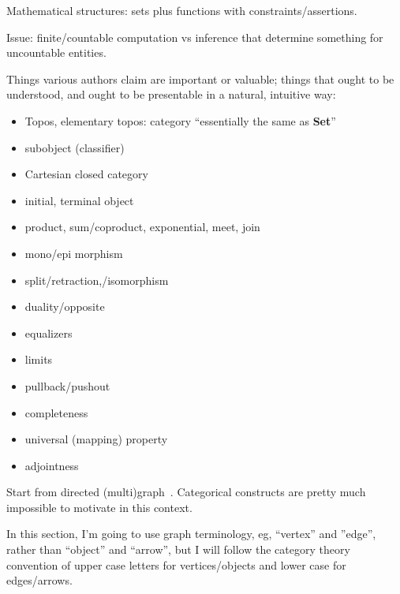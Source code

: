\documentclass[11pt,openany]{article}
\begin{document}
Mathematical structures: sets plus functions with constraints/assertions.

Issue: finite/countable computation vs inference that determine
something for uncountable entities.

\setcounter{currentlevel}{\value{baseSectionLevel}}
\label{sec:Key-ideas}

Things various authors claim are important or valuable;
things that ought to be understood,
and ought to be presentable in a natural, intuitive way:
\begin{itemize}
  \item Topos, elementary topos: 
  category ``essentially the same as \textbf{Set}''
  \item subobject (classifier)
  \item Cartesian closed category
  \item initial, terminal object
  \item product, sum/coproduct, exponential, meet, join
  \item mono/epi morphism
  \item split/retraction,/isomorphism
  \item duality/opposite
  \item equalizers
  \item limits
  \item pullback/pushout
  \item completeness
  \item universal (mapping) property
  \item adjointness
\end{itemize}
\setcounter{currentlevel}{\value{baseSectionLevel}}
\label{sec:Bottom-up}

Start from directed (multi)graph~\cite{wiki:Directed_graph}.
Categorical constructs are pretty much impossible to motivate
in this context.

In this section, I'm going to use graph terminology,
eg, ``vertex'' and ''edge'', rather than ``object'' and ``arrow'',
but I will follow the category theory convention of
upper case letters for vertices/objects and lower case for
edges/arrows.

\label{sec:Directed_graph}
\end{document}
